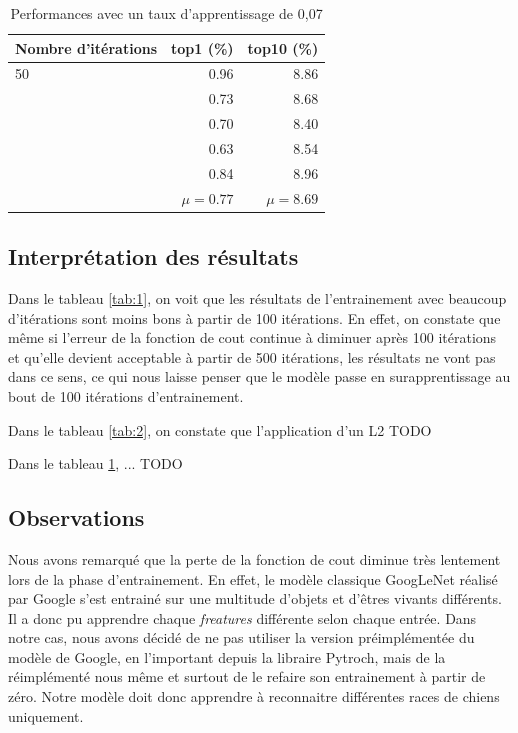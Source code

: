 \documentclass{article}
\begin{document}
\begin{table}[htbp]
\centering
\begin{tabular}{lrr}  
\toprule
Nombre d'itérations & top1 (\%) & top10 (\%) \\
\midrule
50 & 0.96 & 8.86 \\
     & 0.73 & 8.68 \\
     & 0.70 & 8.40 \\
     & 0.63 & 8.54 \\
     & 0.84 & 8.96 \\
     & $\mu = 0.77$ &  $\mu = 8.69$ \\
\bottomrule
\end{tabular}
\caption{Performances avec un taux d'apprentissage de 0,07}
\label{tab:3}
\end{table}

\subsection{Interprétation des résultats}
Dans le tableau \ref{tab:1}, on voit que les résultats de l’entrainement avec
beaucoup d’itérations sont moins bons à partir de 100 itérations. En effet, on
constate que même si l’erreur de la fonction de cout continue à diminuer après
100 itérations et qu’elle devient acceptable à partir de 500 itérations, les
résultats ne vont pas dans ce sens, ce qui nous laisse penser que le modèle
passe en surapprentissage au bout de 100 itérations d’entrainement.

Dans le tableau \ref{tab:2}, on constate que l'application d'un L2 TODO

Dans le tableau \ref{tab:3}, ... TODO

\subsection{Observations}
Nous avons remarqué que la perte de la fonction de cout diminue très lentement
lors de la phase d’entrainement. En effet, le modèle classique GoogLeNet réalisé
par Google s’est entrainé sur une multitude d’objets et d'êtres vivants
différents. Il a donc pu apprendre chaque \textit{freatures} différente selon
chaque entrée. Dans notre cas, nous avons décidé de ne pas utiliser la version
préimplémentée du modèle de Google, en l'important depuis la libraire Pytroch,
mais de la réimplémenté nous même et surtout de le refaire son entrainement à
partir de zéro. Notre modèle doit donc apprendre à reconnaitre différentes races
de chiens uniquement.
\end{document}
